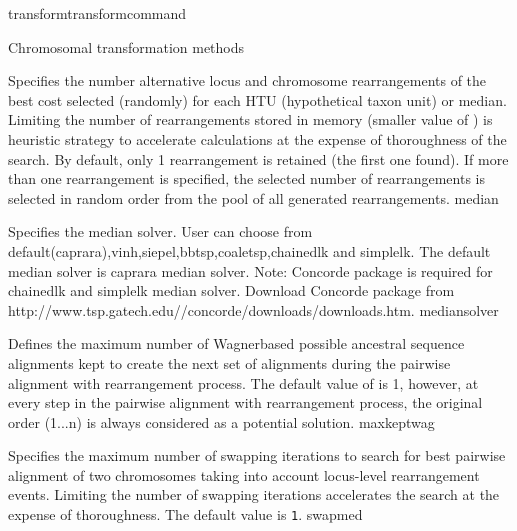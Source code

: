 \begin{command}{transform}{transformcommand}
\begin{arguments}
\begin{argumentgroup}{Chromosomal transformation methods}
\begin{description}
       		      
                        {Specifies the number alternative locus and chromosome
                        rearrangements of the best cost selected (randomly) for
                        each HTU (hypothetical taxon unit) or median. Limiting the number of rearrangements
                        stored in memory (smaller value of )
                        is heuristic strategy to accelerate calculations at the
                        expense of thoroughness of the search. By default, only 1
                        rearrangement is retained (the first one found). If more than
                        one rearrangement is specified, the selected number of
                        rearrangements is selected in random order from the pool of
                        all generated rearrangements.}
                        {median}

                       {Specifies the median solver. User can choose from
                       default(caprara),vinh,siepel,bbtsp,coaletsp,chainedlk and simplelk. The
                       default median solver is caprara median solver. Note:
                       Concorde package is required for chainedlk and simplelk
                       median solver. Download Concorde package from 
                       http://www.tsp.gatech.edu//concorde/downloads/downloads.htm.
                       }
                       {mediansolver}



                        {Defines the maximum number of Wagner\-based possible ancestral sequence
                        alignments kept to create the next set of alignments during the pairwise alignment
                        with rearrangement process.  The default value of  is 1,
                        however, at every step in the pairwise alignment with rearrangement process, the original
                        order (1...n) is always considered as a potential solution.}
                        {maxkeptwag}
                        
                        
                        {Specifies the maximum number of swapping iterations
                        to search for best pairwise alignment of two chromosomes
                        taking into account locus-level rearrangement events. Limiting the number of swapping
                        iterations accelerates the search at the expense of
                        thoroughness. The default value is \texttt{1}.}
                        {swapmed}


\end{description}
\end{argumentgroup}
\end{arguments}
\end{command}
